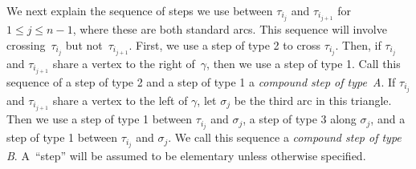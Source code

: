 \documentclass[pdftex]{sigma}%
\numberwithin{equation}{section}
\begin{document}
We next explain the sequence of steps we use between $\tau_{i_j}$ and $\tau_{i_{j+1}}$ for $1 \leq j \leq n-1$, where these are both standard arcs. This sequence will involve crossing~$\tau_{i_j}$ but not~$\tau_{i_{j+1}}$. First, we use a step of type 2 to cross $\tau_{i_j}$. Then, if $\tau_{i_j}$ and $\tau_{i_{j+1}}$ share a vertex to the right of~$\gamma$, then we use a step of type 1. Call this sequence of a step of type 2 and a step of type 1 a \emph{compound step of type~A}. If $\tau_{i_j}$ and $\tau_{i_{j+1}}$ share a vertex to the left of $\gamma$, let $\sigma_j$ be the third arc in this triangle. Then we use a step of type 1 between $\tau_{i_j}$ and $\sigma_j$, a step of type 3 along $\sigma_j$, and a step of type 1 between $\tau_{i_j}$ and $\sigma_j$. We call this sequence a \emph{compound step of type B}. A~``step'' will be assumed to be elementary unless otherwise specified.
\end{document}

